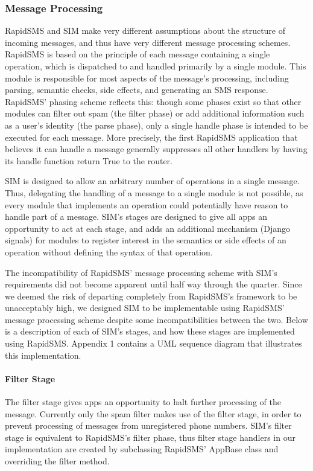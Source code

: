 \documentclass{acm_proc_article-sp}
\begin{document}
\subsubsection{Message Processing}

RapidSMS and SIM make very different assumptions about the structure of incoming messages, and thus have very different message processing schemes. RapidSMS is based on the principle of each message containing a single operation, which is dispatched to and handled primarily by a single module. This module is responsible for most aspects of the message’s processing, including parsing, semantic checks, side effects, and generating an SMS response. RapidSMS’ phasing scheme reflects this: though some phases exist so that other modules can filter out spam (the filter phase) or add additional information such as a user’s identity (the parse phase), only a single handle phase is intended to be executed for each message. More precisely, the first RapidSMS application that believes it can handle a message generally suppresses all other handlers by having its handle function return True to the router.

SIM is designed to allow an arbitrary number of operations in a single message. Thus, delegating the handling of a message to a single module is not possible, as every module that implements an operation could potentially have reason to handle part of a message. SIM’s stages are designed to give all apps an opportunity to act at each stage, and adds an additional mechanism (Django signals) for modules to register interest in the semantics or side effects of an operation without defining the syntax of that operation.

The incompatibility of RapidSMS’ message processing scheme with SIM’s requirements did not become apparent until half way through the quarter. Since we deemed the risk of departing completely from RapidSMS’s framework to be unacceptably high, we designed SIM to be implementable using RapidSMS’ message processing scheme despite some incompatibilities between the two. Below is a description of each of SIM’s stages, and how these stages are implemented using RapidSMS. Appendix 1 contains a UML sequence diagram that illustrates this implementation.

\paragraph{Filter Stage}

The filter stage gives apps an opportunity to halt further processing of the message. Currently only the spam filter makes use of the filter stage, in order to prevent processing of messages from unregistered phone numbers. SIM’s filter stage is equivalent to RapidSMS’s filter phase, thus filter stage handlers in our implementation are created by subclassing RapidSMS’ AppBase class and overriding the filter method.
\end{document}
